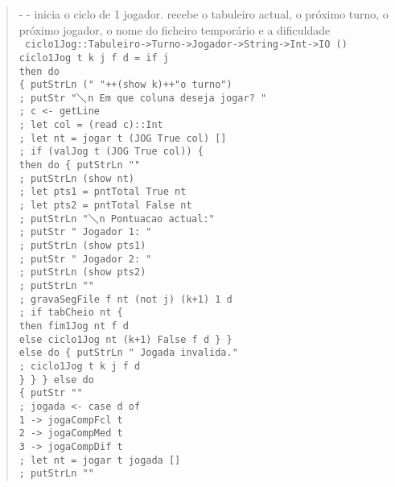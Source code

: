 \documentclass[a4paper,titlepage]{scrreprt}
\begin{document}
		\begin{quote}
			{\small - - inicia o ciclo de 1 jogador. recebe o tabuleiro actual, o próximo turno, o próximo jogador, o nome do ficheiro temporário e a dificuldade\\}
			{\tt
			ciclo1Jog::Tabuleiro->Turno->Jogador->String->Int->IO ()\\
			ciclo1Jog t k j f d = if j\\
			then do\\
			\{ putStrLn (" "++(show k)++"o turno")\\
			; putStr "$\diagdown$n Em que coluna deseja jogar? "\\
			; c <- getLine\\
			; let col = (read c)::Int\\
			; let nt = jogar t (JOG True col) []\\
			; if (valJog t (JOG True col)) \{\\
			then do \{ putStrLn ""\\
			; putStrLn (show nt)\\
			; let pts1 = pntTotal True nt\\
			; let pts2 = pntTotal False nt\\
			; putStrLn "$\diagdown$n Pontuacao actual:"\\
			; putStr " Jogador 1: "\\
			; putStrLn (show pts1)\\
			; putStr " Jogador 2: "\\
			; putStrLn (show pts2)\\
			; putStrLn ""\\
			; gravaSegFile f nt (not j) (k+1) 1 d\\
			; if tabCheio nt \{\\
			then fim1Jog nt f d\\
			else ciclo1Jog nt (k+1) False f d \} \}\\
			else do
			\{ putStrLn " Jogada invalida."\\
			; ciclo1Jog t k j f d\\
			\} \}
			\}
			else do\\
			\{ putStr ""	\\
			; jogada <- case d of\\
			1 -> jogaCompFcl t\\
			2 -> jogaCompMed t\\
			3 -> jogaCompDif t\\
			; let nt = jogar t jogada []\\
			; putStrLn ""\\
}
\end{quote}
\end{document}
